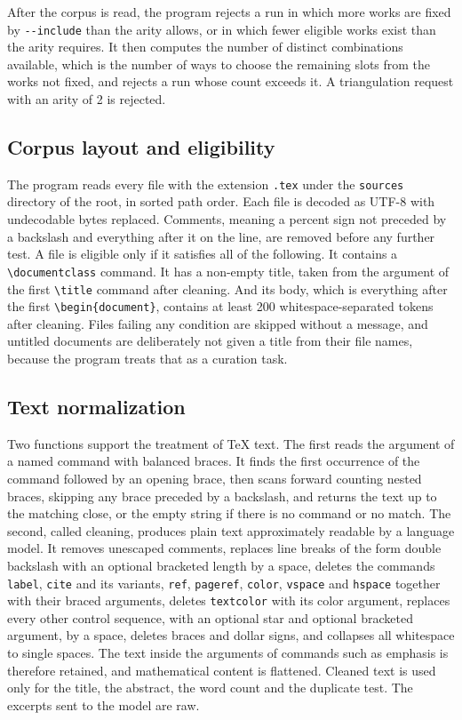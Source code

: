 \documentclass[11pt]{article}
\begin{document}
After the corpus is read, the program rejects a run in which more works are fixed by \texttt{-{}-include} than the arity allows, or in which fewer eligible works exist than the arity requires. It then computes the number of distinct combinations available, which is the number of ways to choose the remaining slots from the works not fixed, and rejects a run whose count exceeds it. A triangulation request with an arity of 2 is rejected.

\subsection{Corpus layout and eligibility}

The program reads every file with the extension \texttt{.tex} under the \texttt{sources} directory of the root, in sorted path order. Each file is decoded as UTF-8 with undecodable bytes replaced. Comments, meaning a percent sign not preceded by a backslash and everything after it on the line, are removed before any further test. A file is eligible only if it satisfies all of the following. It contains a \texttt{\textbackslash documentclass} command. It has a non-empty title, taken from the argument of the first \texttt{\textbackslash title} command after cleaning. And its body, which is everything after the first \texttt{\textbackslash begin\{document\}}, contains at least 200 whitespace-separated tokens after cleaning. Files failing any condition are skipped without a message, and untitled documents are deliberately not given a title from their file names, because the program treats that as a curation task.

\subsection{Text normalization}

Two functions support the treatment of \TeX{} text. The first reads the argument of a named command with balanced braces. It finds the first occurrence of the command followed by an opening brace, then scans forward counting nested braces, skipping any brace preceded by a backslash, and returns the text up to the matching close, or the empty string if there is no command or no match. The second, called cleaning, produces plain text approximately readable by a language model. It removes unescaped comments, replaces line breaks of the form double backslash with an optional bracketed length by a space, deletes the commands \texttt{label}, \texttt{cite} and its variants, \texttt{ref}, \texttt{pageref}, \texttt{color}, \texttt{vspace} and \texttt{hspace} together with their braced arguments, deletes \texttt{textcolor} with its color argument, replaces every other control sequence, with an optional star and optional bracketed argument, by a space, deletes braces and dollar signs, and collapses all whitespace to single spaces. The text inside the arguments of commands such as emphasis is therefore retained, and mathematical content is flattened. Cleaned text is used only for the title, the abstract, the word count and the duplicate test. The excerpts sent to the model are raw.
\end{document}
